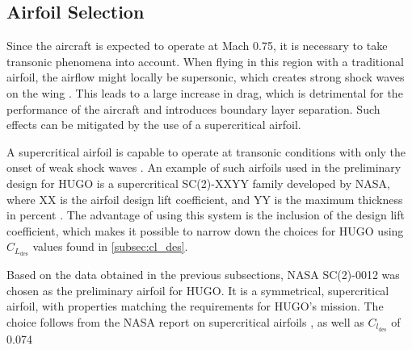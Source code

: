 \subsection{Airfoil Selection}
\label{subsec:airfoil_selection}
Since the aircraft is expected to operate at Mach 0.75, it is necessary to take transonic phenomena into account. When flying in this region with a traditional airfoil, the airflow might locally be supersonic, which creates strong shock waves on the wing \cite{Whitcomb1974}. This leads to a large increase in drag, which is detrimental for the performance of the aircraft and introduces boundary layer separation. Such effects can be mitigated by the use of a supercritical airfoil. 

A supercritical airfoil is capable to operate at transonic conditions with only the onset of weak shock waves \cite{Harris1990}. An example of such airfoils used in the preliminary design for HUGO is a supercritical SC(2)-XXYY family developed by NASA, where XX is the airfoil design lift coefficient, and YY is the maximum thickness in percent \cite{Harris1990}. The advantage of using this system is the inclusion of the design lift coefficient, which makes it possible to narrow down the choices for HUGO using $C_{L_\text{des}}$ values found in \autoref{subsec:cl_des}.

Based on the data obtained in the previous subsections, NASA SC(2)-0012 was chosen as the preliminary airfoil for HUGO. It is a symmetrical, supercritical airfoil, with properties matching the requirements for HUGO's mission. The choice follows from the NASA report on supercritical airfoils \cite{Harris1990}, as well as $C_{l_\text{des}}$ of 0.074



